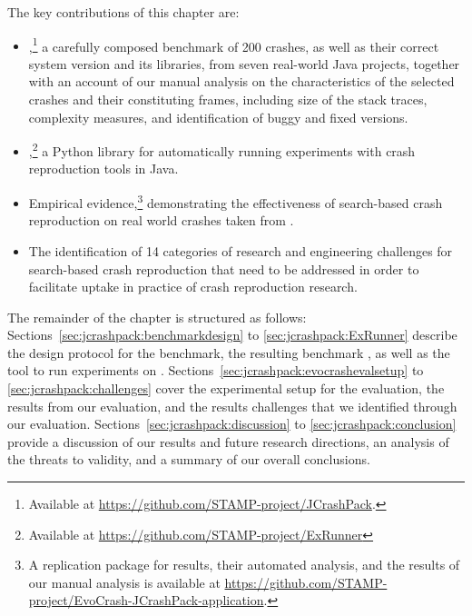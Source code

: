 The key contributions of this chapter are:
\begin{itemize}
\item \crashpack,\footnote{Available at \url{https://github.com/STAMP-project/JCrashPack}.} a carefully composed benchmark of 200 crashes, as well as their correct system version and its libraries, from seven real-world Java projects, together with an account of our manual analysis on the characteristics of the selected crashes and their constituting frames, including size of the stack traces, complexity measures, and identification of buggy and fixed versions.

\item \exrunner,\footnote{Available at \url{https://github.com/STAMP-project/ExRunner}} a Python library for automatically running experiments with crash reproduction tools in Java.

\item Empirical evidence,\footnote{A replication package for \evocrash results, their automated analysis, and the results of our manual analysis is available at \url{https://github.com/STAMP-project/EvoCrash-JCrashPack-application}.} demonstrating the effectiveness of search-based crash reproduction on real world crashes taken from \crashpack.

\item The identification of 14 categories of research and engineering challenges for search-based crash reproduction that need to be addressed in order to facilitate uptake in practice of crash reproduction research.

\end{itemize}

The remainder of the chapter is structured as follows:
Sections~\ref{sec:jcrashpack:benchmarkdesign} to \ref{sec:jcrashpack:ExRunner} describe the design protocol for the benchmark, the resulting benchmark \crashpack, as well as the \exrunner tool to run experiments on \crashpack.
Sections~\ref{sec:jcrashpack:evocrashevalsetup} to \ref{sec:jcrashpack:challenges} cover the experimental setup for the \evocrash evaluation, the results from our evaluation, and the results challenges that we identified through our evaluation.
Sections~\ref{sec:jcrashpack:discussion} to \ref{sec:jcrashpack:conclusion} provide a discussion of our results and future research directions, an analysis of the threats to validity, and a summary of our overall conclusions.

